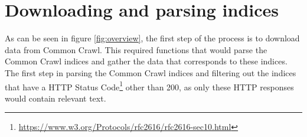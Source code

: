 \section{Downloading and parsing indices}
As can be seen in figure \ref{fig:overview}, the first step of the process is to download data from Common Crawl. This required functions that would parse the Common Crawl indices and gather the data that corresponds to these indices. The first step in parsing the Common Crawl indices and filtering out the indices that have a HTTP Status Code\footnote{\url{https://www.w3.org/Protocols/rfc2616/rfc2616-sec10.html}} other than 200, as only these HTTP responses would contain relevant text.